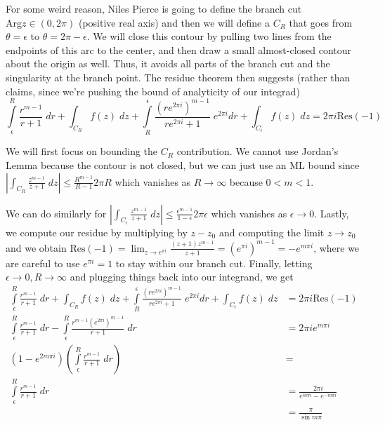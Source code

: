 \documentclass[10pt]{report}
\newcommand{\abs}[1]{\left|#1\right|}
\newcommand{\Arg}[0]{\mathrm{Arg} }
\newcommand{\Res}[0]{\mathrm{Res} }
\begin{document}
For some weird reason, Niles Pierce is going to define the branch cut $\Arg z \in (0,2\pi)$ (positive real axis) and then we will define a $C_R$ that goes from $\theta = \epsilon$ to $\theta = 2\pi - \epsilon$. We will close this contour by pulling two lines from the endpoints of this arc to the center, and then draw a small almost-closed contour about the origin as well. Thus, it avoids all parts of the branch cut and the singularity at the branch point. The residue theorem then suggests (rather than claims, since we're pushing the bound of analyticity of our integrad)
$$\displaystyle\int\limits_{\epsilon}^{R}\frac{r^{m-1}}{r+1}\;dr + \int_{C_R} f(z)\; dz + \displaystyle\int\limits_{R}^{\epsilon}\frac{(re^{2\pi i})^{m-1}}{re^{2\pi i} + 1}\;e^{2\pi i} dr + \int_{C_\epsilon} f(z)\; dz = 2\pi i \Res(-1)$$

We will first focus on bounding the $C_R$ contribution. We cannot use Jordan's Lemma because the contour is not closed, but we can just use an ML bound since $\abs{\int_{C_R}\frac{z^{m-1}}{z+1}\; dz} \leq \frac{R^{m-1}}{R-1}2\pi R$ which vanishes as $R \to \infty$ because $0 < m < 1$.

We can do similarly for $\abs{\int_{C_\epsilon} \frac{z^{m-1}}{z+1}\; dz} \leq \frac{\epsilon^{m-1}}{1-\epsilon}2\pi \epsilon$ which vanishes as $\epsilon \to 0$. Lastly, we compute our residue by multiplying by $z-z_0$ and computing the limit $z \to z_0$ and we obtain $\Res(-1) = \lim_{z \to e^{\pi i}} \frac{(z+1)z^{m-1}}{z+1} = \left( e^{\pi i} \right)^{m-1} = -e^{m\pi i}$, where we are careful to use $e^{\pi i} = 1$ to stay within our branch cut. Finally, letting $\epsilon \to 0, R \to \infty$ and plugging things back into our integrand, we get
\begin{align*}
    \displaystyle\int\limits_{\epsilon}^{R}\frac{r^{m-1}}{r+1}\;dr + \int_{C_R} f(z)\; dz + \displaystyle\int\limits_{R}^{\epsilon}\frac{(re^{2\pi i})^{m-1}}{re^{2\pi i} + 1}\;e^{2\pi i} dr + \int_{C_\epsilon} f(z)\; dz &= 2\pi i \Res(-1)\\
    \displaystyle\int\limits_{\epsilon}^{R}\frac{r^{m-1}}{r+1}\;dr -\displaystyle\int\limits_{\epsilon}^{R}\frac{r^{m-1}(e^{2\pi i})^{m-1}}{r + 1}\; dr &= 2\pi i e^{m\pi i}\\
    \left( 1-e^{2m\pi i} \right)\left(\displaystyle\int\limits_{\epsilon}^{R}\frac{r^{m-1}}{r+1}\;dr \right)&= \\
    \displaystyle\int\limits_{\epsilon}^{R}\frac{r^{m-1}}{r+1}\;dr &= \frac{2\pi i}{e^{m\pi i} - e^{-m\pi i}}\\
    &= \frac{\pi}{\sin m\pi}
\end{align*}
\end{document}
